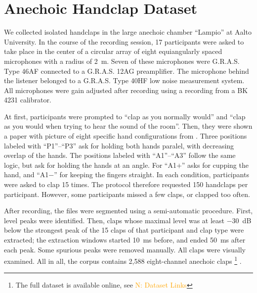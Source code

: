 \documentclass{article}
\newcommand{\nils}[1]{\textcolor{orange}{N: #1}}
\begin{document}

\section{Anechoic Handclap Dataset}
\label{sec:dataset}


We collected isolated handclaps in the large anechoic chamber ``Lampio'' at Aalto University.
In the course of the recording session, 17 participants were asked to take place in the center of a circular array of eight equiangularly spaced microphones with a radius of 2~m. Seven of these microphones were G.R.A.S. Type 46AF connected to a G.R.A.S. 12AG preamplifier. The microphone behind the listener belonged to a G.R.A.S. Type 40HF low noise measurement system. All microphones were gain adjusted after recording using a recording from a BK 4231 calibrator. 

At first, participants were prompted to ``clap as you normally would'' and ``clap as you would when trying to hear the sound of the room''. Then, they were shown a paper with picture of eight specific hand configurations from \cite{peltola2007synthesis}. Three positions labeled with ``P1''--``P3'' ask for holding both hands paralel, with decreasing overlap of the hands. The positions labeled with ``A1''--``A3'' follow the same logic, but ask for holding the hands at an angle.
For ``A1$+$'' asks for cupping the hand, and ``A1$-$'' for keeping the fingers straight. In each condition, participants were asked to clap 15 times. The protocol therefore requested 150 handclaps per participant. However, some participants missed a few claps, or clapped too often.

After recording, the files were segmented using a semi-automatic procedure. First, level peaks were identified. Then, claps whose maximal level was at least $-30$~dB below the strongest peak of the 15 claps of that participant and clap type were extracted; the extraction windows started 10~ms before, and ended 50~ms after each peak. Some spurious peaks were removed manually. All claps were visually examined. All in all, the corpus contains 2,588 eight-channel anechoic claps 
\footnote{The full dataset is available online, see \nils{Dataset Links}}
.
\end{document}

